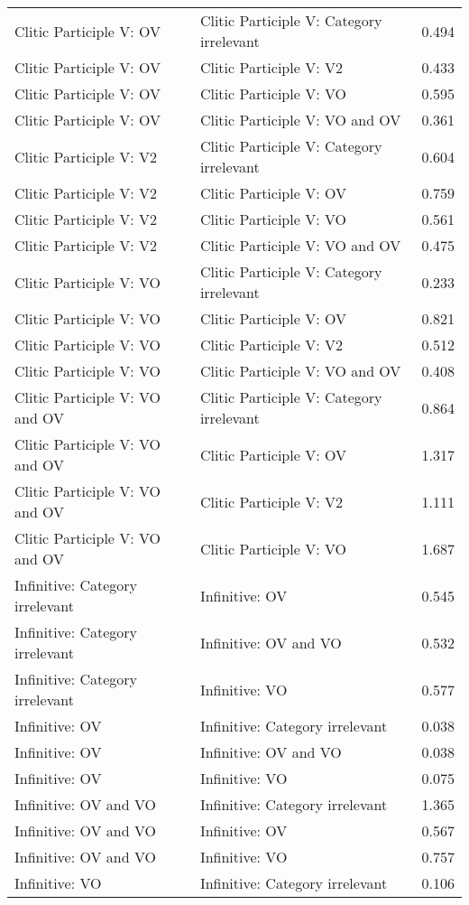 \begin{longtable}{p{.4\linewidth}p{.4\linewidth}p{.1\linewidth}}
Clitic Participle V: OV & Clitic Participle V: Category irrelevant & 0.494\\
Clitic Participle V: OV & Clitic Participle V: V2 & 0.433\\
Clitic Participle V: OV & Clitic Participle V: VO & 0.595\\
Clitic Participle V: OV & Clitic Participle V: VO and OV & 0.361\\
Clitic Participle V: V2 & Clitic Participle V: Category irrelevant & 0.604\\
Clitic Participle V: V2 & Clitic Participle V: OV & 0.759\\
Clitic Participle V: V2 & Clitic Participle V: VO & 0.561\\
Clitic Participle V: V2 & Clitic Participle V: VO and OV & 0.475\\
Clitic Participle V: VO & Clitic Participle V: Category irrelevant & 0.233\\
Clitic Participle V: VO & Clitic Participle V: OV & 0.821\\
Clitic Participle V: VO & Clitic Participle V: V2 & 0.512\\
Clitic Participle V: VO & Clitic Participle V: VO and OV & 0.408\\
Clitic Participle V: VO and OV & Clitic Participle V: Category irrelevant & 0.864\\
Clitic Participle V: VO and OV & Clitic Participle V: OV & 1.317\\
Clitic Participle V: VO and OV & Clitic Participle V: V2 & 1.111\\
Clitic Participle V: VO and OV & Clitic Participle V: VO & 1.687\\
Infinitive: Category irrelevant & Infinitive: OV & 0.545\\
Infinitive: Category irrelevant & Infinitive: OV and VO & 0.532\\
Infinitive: Category irrelevant & Infinitive: VO & 0.577\\
Infinitive: OV & Infinitive: Category irrelevant & 0.038\\
Infinitive: OV & Infinitive: OV and VO & 0.038\\
Infinitive: OV & Infinitive: VO & 0.075\\
Infinitive: OV and VO & Infinitive: Category irrelevant & 1.365\\
Infinitive: OV and VO & Infinitive: OV & 0.567\\
Infinitive: OV and VO & Infinitive: VO & 0.757\\
Infinitive: VO & Infinitive: Category irrelevant & 0.106\\

\end{longtable}
